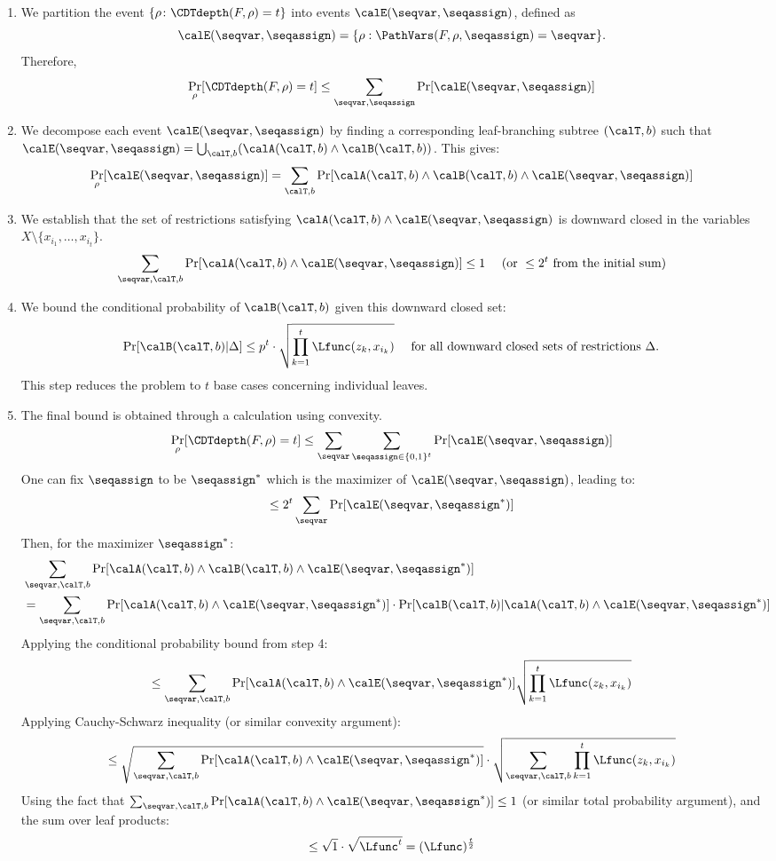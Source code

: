 \begin{enumerate}
    \item We partition the event $\{\rho \colon \CDTdepth(F,\rho) = t\}$ into events $\calE(\seqvar,\seqassign)$, defined as $$\calE(\seqvar,\seqassign) = \{\rho : \PathVars(F,\rho, \seqassign) = \seqvar\}.$$
    Therefore, 
    $$\Pr_\rho [\CDTdepth(F,\rho) = t] \leq \sum_{\seqvar,\seqassign} \Pr[\calE(\seqvar,\seqassign)]$$
    \item We decompose each event $\calE(\seqvar,\seqassign)$ by finding a corresponding leaf-branching subtree $(\calT, b)$ such that $\calE(\seqvar,\seqassign) = \bigcup_{\calT,b} (\calA(\calT,b) \land \calB(\calT,b))$.
    This gives:
    \[
    \Pr_\rho[\calE(\seqvar,\seqassign)] = \sum_{\calT,b}\Pr[\calA(\calT,b) \land \calB(\calT,b) \land \calE(\seqvar, \seqassign)]
    \]
    \item We establish that the set of restrictions satisfying $\calA(\calT,b) \land \calE(\seqvar,\seqassign)$ is downward closed in the variables $X \setminus \{x_{i_1}, \dots , x_{i_t}\}$.
    \[
    \sum_{\seqvar,\calT,b} \Pr[\calA(\calT,b) \land \calE(\seqvar,\seqassign)] \leq 1 \quad \text{ (or } \le 2^t \text{ from the initial sum)}
    \]
    \item We bound the conditional probability of $\calB(\calT,b)$ given this downward closed set:
    \[
    \Pr[\calB(\calT,b)| \Delta] \leq p^t \cdot \sqrt{\prod_{k=1}^t \Lfunc(z_k, x_{i_k})} \quad \text{ for all downward closed sets of restrictions } \Delta.
    \]
    This step reduces the problem to $t$ base cases concerning individual leaves.
    \item The final bound is obtained through a calculation using convexity.
    \[
    \Pr_\rho[\CDTdepth(F,\rho) = t] \leq \sum_{\seqvar} \sum_{\seqassign \in \{0,1\}^t} \Pr[\calE(\seqvar,\seqassign)]
    \]
    One can fix $\seqassign$ to be $\seqassign^*$ which is the maximizer of $\calE(\seqvar,\seqassign)$, leading to:
    \[
    \leq 2^t \sum_{\seqvar} \Pr[\calE(\seqvar,\seqassign^*)]
    \]
    Then, for the maximizer $\seqassign^*$:
    \begin{align*}
    &\sum_{\seqvar,\calT,b} \Pr[\calA(\calT,b) \land \calB(\calT,b) \land \calE(\seqvar,\seqassign^*)] \\
    &= \sum_{\seqvar, \calT,b} \Pr[\calA(\calT,b)\land \calE(\seqvar,\seqassign^*)] \cdot \Pr[\calB(\calT,b)| \calA(\calT,b)\land \calE(\seqvar,\seqassign^*)]
    \end{align*}
    Applying the conditional probability bound from step 4:
    \[
    \leq \sum_{\seqvar, \calT,b} \Pr[\calA(\calT,b)\land \calE(\seqvar,\seqassign^*)] \sqrt{\prod_{k=1}^t \Lfunc(z_k, x_{i_k})}
    \]
    Applying Cauchy-Schwarz inequality (or similar convexity argument):
    \[
    \leq \sqrt{\sum_{\seqvar,\calT,b} \Pr[\calA(\calT,b)\land \calE(\seqvar,\seqassign^*)]} \cdot \sqrt{\sum_{\seqvar,\calT,b} \prod_{k=1}^t \Lfunc(z_k, x_{i_k})}
    \]
    Using the fact that $\sum_{\seqvar, \calT,b} \Pr[\calA(\calT,b)\land \calE(\seqvar,\seqassign^*)] \leq 1$ (or similar total probability argument), and the sum over leaf products:
    \[
    \leq \sqrt{1} \cdot \sqrt{\Lfunc^t} = (\Lfunc)^{\frac{t}{2}}  
    \]
\end{enumerate}
